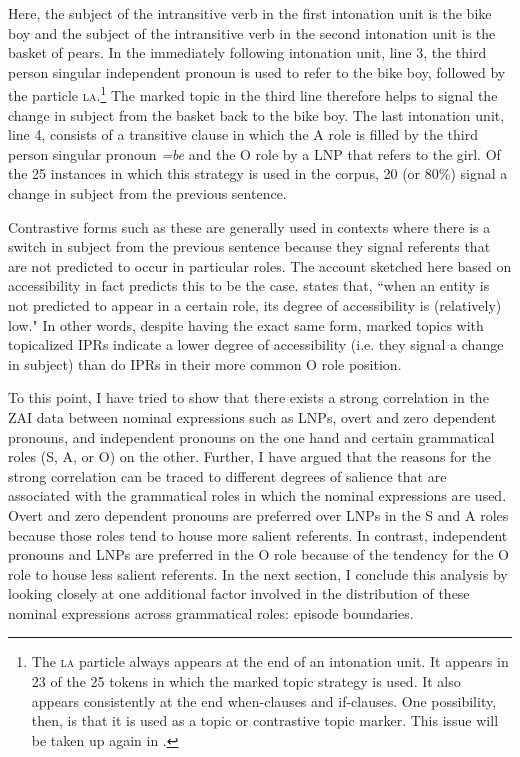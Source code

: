\z
Here, the subject of the intransitive verb in the first intonation unit is the bike boy and the subject of the intransitive verb in the second intonation unit is the basket of pears. In the immediately following intonation unit, line 3, the third person singular independent pronoun is used to refer to the bike boy, followed by the particle \textsc{la}.\footnote{The \textsc{la} particle always appears at the end of an intonation unit. It appears in 23 of the 25 tokens in which the marked topic strategy is used. It also appears consistently at the end when-clauses and if-clauses. One possibility, then, is that it is used as a topic or contrastive topic marker. This issue will be taken up again in .} The marked topic in the third line therefore helps to signal the change in subject from the basket back to the bike boy. The last intonation unit, line 4, consists of a transitive clause in which the A role is filled by the third person singular pronoun \textit{=be} and the O role by a LNP that refers to the girl. Of the 25 instances in which this strategy is used in the corpus, 20 (or 80{\%}) signal a change in subject from the previous sentence. 


Contrastive forms such as these are generally used in contexts where there is a switch in subject from the previous sentence because they signal referents that are not predicted to occur in particular roles. The account sketched here based on accessibility in fact predicts this to be the case. \citet[37]{ariel2001} states that, ``when an entity is not predicted to appear in a certain role, its degree of accessibility is (relatively) low." In other words, despite having the exact same form, marked topics with topicalized IPRs indicate a lower degree of accessibility (i.e. they signal a change in subject) than do IPRs in their more common O role position. 

To this point, I have tried to show that there exists a strong correlation in the ZAI data between nominal expressions such as LNPs, overt and zero dependent pronouns, and independent pronouns on the one hand and certain grammatical roles (S, A, or O) on the other. Further, I have argued that the reasons for the strong correlation can be traced to different degrees of salience that are associated with the grammatical roles in which the nominal expressions are used. Overt and zero dependent pronouns are preferred over LNPs in the S and A roles because those roles tend to house more salient referents. In contrast, independent pronouns and LNPs are preferred in the O role because of the tendency for the O role to house less salient referents. In the next section, I conclude this analysis by looking closely at one additional factor involved in the distribution of these nominal expressions across grammatical roles: episode boundaries.


